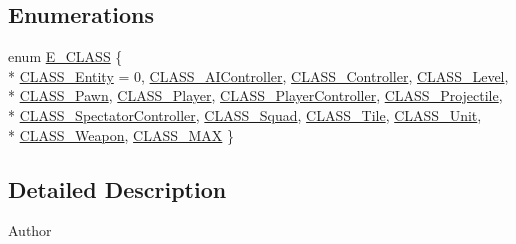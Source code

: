 \subsection*{Enumerations}
\begin{DoxyCompactItemize}
\item 
enum \hyperlink{_engine_8h_ab1adc9d93c99be93f3e5394277110aa9}{E\-\_\-\-C\-L\-A\-S\-S} \{ \\*
\hyperlink{_engine_8h_ab1adc9d93c99be93f3e5394277110aa9a76c830d8438f360d5ca08bd78c14d5cc}{C\-L\-A\-S\-S\-\_\-\-Entity} =  0, 
\hyperlink{_engine_8h_ab1adc9d93c99be93f3e5394277110aa9a4dd03d2ea3ac1ca9378892f67f426055}{C\-L\-A\-S\-S\-\_\-\-A\-I\-Controller}, 
\hyperlink{_engine_8h_ab1adc9d93c99be93f3e5394277110aa9a9f274e014111b533169254cb46e86271}{C\-L\-A\-S\-S\-\_\-\-Controller}, 
\hyperlink{_engine_8h_ab1adc9d93c99be93f3e5394277110aa9ab124f2ece08941fa0554847692223a0b}{C\-L\-A\-S\-S\-\_\-\-Level}, 
\\*
\hyperlink{_engine_8h_ab1adc9d93c99be93f3e5394277110aa9a135043995889c589e75455a7aca186c9}{C\-L\-A\-S\-S\-\_\-\-Pawn}, 
\hyperlink{_engine_8h_ab1adc9d93c99be93f3e5394277110aa9ab528ada46435680e497df47adc5c1465}{C\-L\-A\-S\-S\-\_\-\-Player}, 
\hyperlink{_engine_8h_ab1adc9d93c99be93f3e5394277110aa9aad7dc4b39332a6e5a34f0d78c0d7213f}{C\-L\-A\-S\-S\-\_\-\-Player\-Controller}, 
\hyperlink{_engine_8h_ab1adc9d93c99be93f3e5394277110aa9a1e60c505d5076a91362bccf79ef89325}{C\-L\-A\-S\-S\-\_\-\-Projectile}, 
\\*
\hyperlink{_engine_8h_ab1adc9d93c99be93f3e5394277110aa9a8d73c38d3399595546fb7adb3e67d0b1}{C\-L\-A\-S\-S\-\_\-\-Spectator\-Controller}, 
\hyperlink{_engine_8h_ab1adc9d93c99be93f3e5394277110aa9a21224ebca30223ce9d6bbe320d2723b7}{C\-L\-A\-S\-S\-\_\-\-Squad}, 
\hyperlink{_engine_8h_ab1adc9d93c99be93f3e5394277110aa9acdc7b1409d8cb516ba20ae94bdddbc65}{C\-L\-A\-S\-S\-\_\-\-Tile}, 
\hyperlink{_engine_8h_ab1adc9d93c99be93f3e5394277110aa9a4dec73c4d9e9be459d68771653290369}{C\-L\-A\-S\-S\-\_\-\-Unit}, 
\\*
\hyperlink{_engine_8h_ab1adc9d93c99be93f3e5394277110aa9adf34dda09bdab2280d4d61518fe8af32}{C\-L\-A\-S\-S\-\_\-\-Weapon}, 
\hyperlink{_engine_8h_ab1adc9d93c99be93f3e5394277110aa9a56165cc27abde7041bdcd594d33ea0e6}{C\-L\-A\-S\-S\-\_\-\-M\-A\-X}
 \}
\end{DoxyCompactItemize}


\subsection{Detailed Description}
\begin{DoxyAuthor}{Author}

\end{DoxyAuthor}


